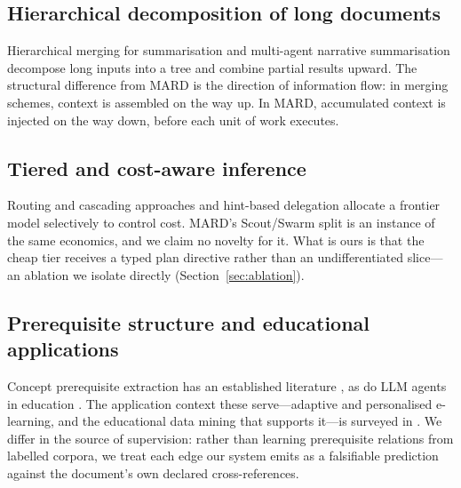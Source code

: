 \documentclass[conference]{IEEEtran}
\begin{document}
\subsection{Hierarchical decomposition of long documents}
Hierarchical merging for summarisation \cite{ou2025hierarchical} and
multi-agent narrative summarisation \cite{kim2025nexussum} decompose long
inputs into a tree and combine partial results upward. The structural
difference from MARD is the direction of information flow: in merging
schemes, context is assembled on the way up. In MARD, accumulated context is
injected on the way down, before each unit of work executes.

\subsection{Tiered and cost-aware inference}
Routing and cascading approaches \cite{ong2024routellm,moslem2026routing} and
hint-based delegation \cite{dong2026hints} allocate a frontier model
selectively to control cost. MARD's Scout/Swarm split is an instance of the
same economics, and we claim no novelty for it. What is ours is that the
cheap tier receives a typed plan directive rather than an undifferentiated
slice---an ablation we isolate directly (Section~\ref{sec:ablation}).

\subsection{Prerequisite structure and educational applications}
Concept prerequisite extraction has an established literature
\cite{li2021prereq,sun2024learningpath,prereqsurvey2025}, as do LLM agents in
education \cite{wu2025agents,tufino2025notebooklm}. The application context
these serve---adaptive and personalised e-learning, and the educational data
mining that supports it---is surveyed in \cite{sweta2021edm}. We differ in the
source of supervision: rather than learning prerequisite relations from labelled
corpora, we treat each edge our system emits as a falsifiable prediction
against the document's own declared cross-references.
\end{document}
